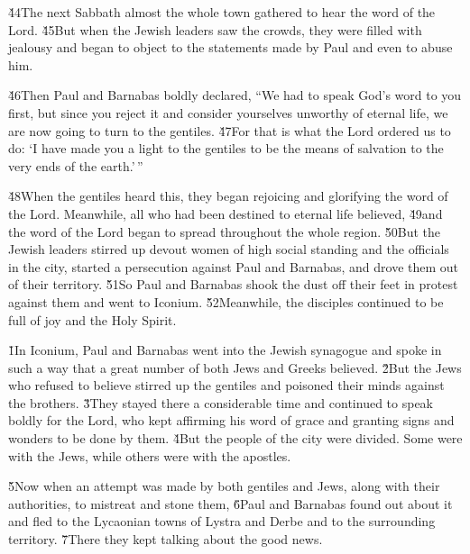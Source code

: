 \v{44}The next Sabbath almost the whole town gathered to hear the word of the Lord. \v{45}But when the Jewish leaders saw the crowds, they were filled with jealousy and began to object to the statements made by Paul and even to abuse him.

\v{46}Then Paul and Barnabas boldly declared, ``We had to speak God's word to you first, but since you reject it and consider yourselves unworthy of eternal life, we are now going to turn to the gentiles. \v{47}For that is what the Lord ordered us to do: `I have made you a light to the gentiles to be the means of salvation to the very ends of the earth.'\,''

\v{48}When the gentiles heard this, they began rejoicing and glorifying the word of the Lord. Meanwhile, all who had been destined to eternal life believed, \v{49}and the word of the Lord began to spread throughout the whole region. \v{50}But the Jewish leaders stirred up devout women of high social standing and the officials in the city, started a persecution against Paul and Barnabas, and drove them out of their territory. \v{51}So Paul and Barnabas shook the dust off their feet in protest against them and went to Iconium. \v{52}Meanwhile, the disciples continued to be full of joy and the Holy Spirit.

\v{1}In Iconium, Paul and Barnabas went into the Jewish synagogue and spoke in such a way that a great number of both Jews and Greeks believed. \v{2}But the Jews who refused to believe stirred up the gentiles and poisoned their minds against the brothers. \v{3}They stayed there a considerable time and continued to speak boldly for the Lord, who kept affirming his word of grace and granting signs and wonders to be done by them. \v{4}But the people of the city were divided. Some were with the Jews, while others were with the apostles.

\v{5}Now when an attempt was made by both gentiles and Jews, along with their authorities, to mistreat and stone them, \v{6}Paul and Barnabas found out about it and fled to the Lycaonian towns of Lystra and Derbe and to the surrounding territory. \v{7}There they kept talking about the good news.

